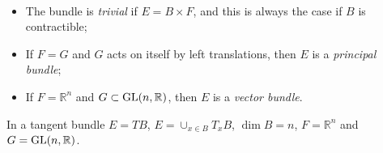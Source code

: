 \documentclass[a4paper,11pt]{article}
\begin{document}
    \begin{rmk}
        ~
        \begin{itemize}
            \item The bundle is \emph{trivial} if $E = B \times F$, and this is always the case if $B$ is contractible;

            \item If $F=G$ and $G$ acts on itself by left translations, then $E$ is a \emph{principal bundle};
        
            \item If $F=\mathbb{R}^n$ and $G \subset \operatorname{GL}(n,\mathbb{R})$, then $E$ is a \emph{vector bundle}.
        \end{itemize}
    \end{rmk}
    \begin{ex}
        In a tangent bundle $E = TB$, $E = \cup_{x\in B} T_x B$, $\dim B = n$, $F = \mathbb{R}^n$ and $G = \operatorname{GL}(n,\mathbb{R})$.
    \end{ex}
\end{document}
